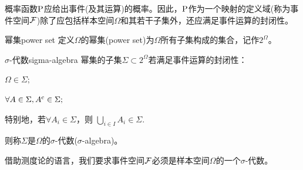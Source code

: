 概率函数$\P$应给出事件(及其运算)的概率。因此，$\P$作为一个映射的定义域(称为事件空间$\cF$)除了应包括样本空间$\Omega$和其若干子集外，还应满足事件运算的封闭性。

\begin{definition}
	{幂集}{power set}
	定义$\Omega$的幂集(power set)为$\Omega$所有子集构成的集合，记作$2^\Omega$。
\end{definition}

\begin{definition}{$\sigma$-代数}{sigma-algebra}
	幂集的子集$\Sigma\subset 2^\Omega$若满足事件运算的封闭性：
	\begin{compactenum}
		\item $\Omega \in \Sigma;$
		\item $\forall A \in \Sigma, A\c \in \Sigma;$
		\item 特别地，若$\forall A_i \in \Sigma$，则
		$\bigcup\nolimits_{i\in I} A_i \in \Sigma.$
	\end{compactenum}
	则称$\Sigma$是$\Omega$的$\sigma$-代数($\sigma$-algebra)。
\end{definition}

借助测度论的语言，我们要求事件空间$\cF$必须是样本空间$\Omega$的一个$\sigma$-代数。

